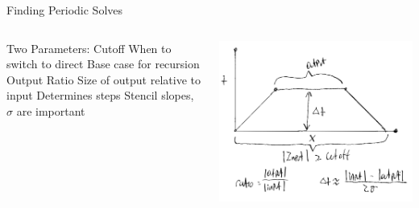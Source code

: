 \begin{frame}{Finding Periodic Solves}
  \begin{columns}
  \begin{outline}
  \1 Two Parameters:
  \1 Cutoff 
  \2 When to switch to direct
  \2 Base case for recursion
  \1 Output Ratio
  \2 Size of output relative to input 
  \2 Determines steps
  \2 Stencil slopes, $\sigma$ are important
  \end{outline}

  \begin{center}
  \centering
  \includegraphics[width=\textwidth]{fft_solve_diagram.png}
  \end{center}
\end{columns}
\end{frame}

